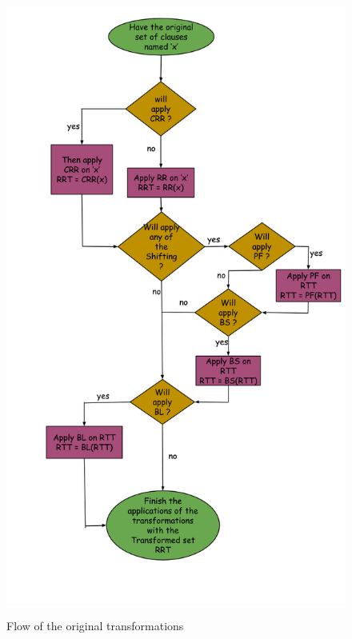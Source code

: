 		\begin{figure}[H]
			\centering
 		 	\scalebox{0.38}
 			{\includegraphics{pictures/Original_transformations_flow.png}}
 			\caption{Flow of the original transformations}\label{fig:original_transformations_flow}
		\end{figure}